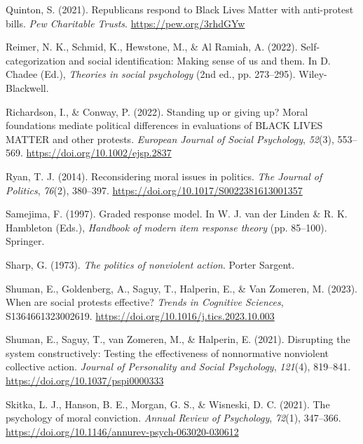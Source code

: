 \documentclass[12pt, letterpaper]{article}
\newenvironment{CSLReferences}[2]{}{}
\begin{document}
\begin{CSLReferences}{1}{0}
\leavevmode{}%
Quinton, S. (2021). Republicans respond to {Black Lives Matter} with
anti-protest bills. \emph{Pew Charitable Trusts}.
\url{https://pew.org/3rhdGYw}

\leavevmode{}%
Reimer, N. K., Schmid, K., Hewstone, M., \& Al Ramiah, A. (2022).
Self-categorization and social identification: Making sense of us and
them. In D. Chadee (Ed.), \emph{Theories in social psychology} (2nd ed.,
pp. 273--295). Wiley-Blackwell.

\leavevmode{}%
Richardson, I., \& Conway, P. (2022). Standing up or giving up? {Moral}
foundations mediate political differences in evaluations of {BLACK}
{LIVES} {MATTER} and other protests. \emph{European Journal of Social
Psychology}, \emph{52}(3), 553--569.
\url{https://doi.org/10.1002/ejsp.2837}

\leavevmode{}%
Ryan, T. J. (2014). Reconsidering moral issues in politics. \emph{The
Journal of Politics}, \emph{76}(2), 380--397.
\url{https://doi.org/10.1017/S0022381613001357}

\leavevmode{}%
Samejima, F. (1997). Graded response model. In W. J. van der Linden \&
R. K. Hambleton (Eds.), \emph{Handbook of modern item response theory}
(pp. 85--100). Springer.

\leavevmode{}%
Sharp, G. (1973). \emph{The politics of nonviolent action}. Porter
Sargent.

\leavevmode{}%
Shuman, E., Goldenberg, A., Saguy, T., Halperin, E., \& Van Zomeren, M.
(2023). When are social protests effective? \emph{Trends in Cognitive
Sciences}, S1364661323002619.
\url{https://doi.org/10.1016/j.tics.2023.10.003}

\leavevmode{}%
Shuman, E., Saguy, T., van Zomeren, M., \& Halperin, E. (2021).
Disrupting the system constructively: {Testing} the effectiveness of
nonnormative nonviolent collective action. \emph{Journal of Personality
and Social Psychology}, \emph{121}(4), 819--841.
\url{https://doi.org/10.1037/pspi0000333}

\leavevmode{}%
Skitka, L. J., Hanson, B. E., Morgan, G. S., \& Wisneski, D. C. (2021).
The psychology of moral conviction. \emph{Annual Review of Psychology},
\emph{72}(1), 347--366.
\url{https://doi.org/10.1146/annurev-psych-063020-030612}


\end{CSLReferences}
\end{document}
